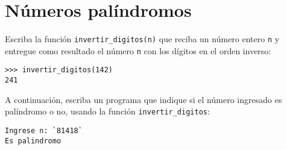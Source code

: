 \section{Números palíndromos}

Escriba la función \lstinline!invertir_digitos(n)! que reciba un número
entero \lstinline!n! y entregue como resultado el número \lstinline!n!
con los dígitos en el orden inverso:

\begin{lstlisting}
>>> invertir_digitos(142)
241
\end{lstlisting}

A continuación, escriba un programa que indique si el número ingresado
es palíndromo o no, usando la función \lstinline!invertir_digitos!:

\begin{lstlisting}[language=testcase]
Ingrese n: `81418`
Es palindromo
\end{lstlisting}
